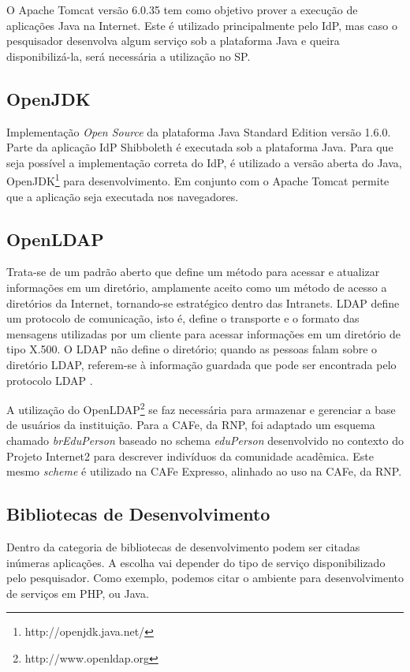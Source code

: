 O Apache Tomcat versão 6.0.35 tem como objetivo prover a execução de aplicações Java na Internet. Este é utilizado principalmente pelo IdP, mas caso o pesquisador desenvolva algum serviço sob a plataforma Java e queira disponibilizá-la, será necessária a utilização no SP.

\subsection{OpenJDK}

Implementação \textit{Open Source} da plataforma Java Standard Edition versão 1.6.0. Parte da aplicação IdP Shibboleth é executada sob a plataforma Java. Para que seja possível a implementação correta do IdP, é utilizado a versão aberta do Java, OpenJDK\footnote{http://openjdk.java.net/} para desenvolvimento. Em conjunto com o Apache Tomcat permite que a aplicação seja executada nos navegadores.

\subsection{OpenLDAP}

Trata-se de um padrão aberto que define um método para acessar e atualizar informações em um diretório, amplamente aceito como um método de acesso a diretórios da Internet, tornando-se estratégico dentro das Intranets. LDAP define um protocolo de comunicação, isto é, define o transporte e o formato das mensagens utilizadas por um cliente para acessar informações em um diretório de tipo X.500. O LDAP não define o diretório; quando as pessoas falam sobre o diretório LDAP, referem-se à informação guardada que pode ser encontrada pelo protocolo LDAP \cite{moreira:11}.

A utilização do OpenLDAP\footnote{http://www.openldap.org} se faz necessária para armazenar e gerenciar a base de usuários da instituição. Para a CAFe, da RNP, foi adaptado um esquema chamado \textit{brEduPerson} baseado no schema \textit{eduPerson} desenvolvido no contexto do Projeto Internet2 \cite{internet2:08} para descrever indivíduos da comunidade acadêmica. Este mesmo \textit{scheme} é utilizado na CAFe Expresso, alinhado ao uso na CAFe, da RNP.

\subsection{Bibliotecas de Desenvolvimento}

Dentro da categoria de bibliotecas de desenvolvimento podem ser citadas inúmeras aplicações. A escolha vai depender do tipo de serviço disponibilizado pelo pesquisador. Como exemplo, podemos citar o ambiente para desenvolvimento de serviços em PHP, ou Java.

